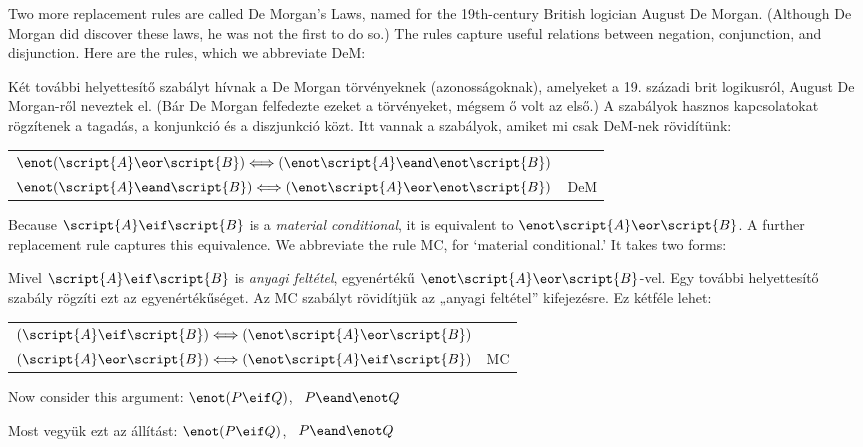 Two more replacement rules are called De Morgan's Laws, named for the 19th-century British logician August De Morgan. (Although De Morgan did discover these laws, he was not the first to do so.) The rules capture useful relations between negation, conjunction, and disjunction. Here are the rules, which we abbreviate DeM:

Két további helyettesítő szabályt hívnak a De Morgan törvényeknek (azonosságoknak), amelyeket a 19. századi brit logikusról, August De Morgan-ről neveztek el. (Bár De Morgan felfedezte ezeket a törvényeket, mégsem ő volt az első.) A szabályok hasznos kapcsolatokat rögzítenek a tagadás, a konjunkció és a diszjunkció közt. Itt vannak a szabályok, amiket mi csak DeM-nek rövidítünk:



\begin{center}
\begin{tabular}{rl}
$\enot(\script{A}\eor\script{B}) \Longleftrightarrow (\enot\script{A}\eand\enot\script{B})$\\
$\enot(\script{A}\eand\script{B}) \Longleftrightarrow (\enot\script{A}\eor\enot\script{B})$
& DeM
\end{tabular}
\end{center}

Because $\script{A}\eif\script{B}$ is a \emph{material conditional}, it is equivalent to $\enot\script{A}\eor\script{B}$. A further replacement rule captures this equivalence. We abbreviate the rule MC, for `material conditional.' It takes two forms:

Mivel $\script{A}\eif\script{B}$ is \emph{anyagi feltétel}, egyenértékű $\enot\script{A}\eor\script{B}$-vel. Egy további helyettesítő szabály rögzíti ezt az egyenértékűséget. Az MC szabályt rövidítjük az „anyagi feltétel” kifejezésre. Ez kétféle lehet:

\begin{center}
\begin{tabular}{rl}
$(\script{A}\eif\script{B}) \Longleftrightarrow (\enot\script{A}\eor\script{B})$ &\\
$(\script{A}\eor\script{B}) \Longleftrightarrow (\enot\script{A}\eif\script{B})$ & MC
\end{tabular}
\end{center}

Now consider this argument: $\enot(P \eif Q)$, \therefore\ $P \eand \enot Q$

Most vegyük ezt az állítást: $\enot(P \eif Q)$, \therefore\ $P \eand \enot Q$

